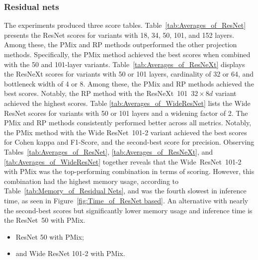 




\FloatBarrier

\subsubsection{Residual nets}

The experiments produced three score tables.
Table~\ref{tab:Averages_of_ResNet} presents the ResNet scores for variants with 18, 34, 50, 101, and 152 layers. Among these, the \gls{PMix} and \gls{RP} methods outperformed the other projection methods. Specifically, the \gls{PMix} method achieved the best scores when combined with the 50 and 101-layer variants.
Table~\ref{tab:Averages_of_ResNeXt} displays the ResNeXt scores for variants with 50 or 101 layers, cardinality of 32 or 64, and bottleneck width of 4 or 8. Among these, the \gls{PMix} and \gls{RP} methods achieved the best scores. Notably, the \gls{RP} method with the \mbox{ResNeXt 101 $32\times 8d$} variant achieved the highest scores.
Table \ref{tab:Averages_of_WideResNet} lists the Wide ResNet scores for variants with 50 or 101 layers and a widening factor of 2. The \gls{PMix} and \gls{RP} methods consistently performed better across all metrics. Notably, the \gls{PMix} method with the Wide \mbox{ResNet 101-2} variant achieved the best scores for Cohen kappa and F1-Score, and the second-best score for precision.
Observing Tables~\ref{tab:Averages_of_ResNet}, \ref{tab:Averages_of_ResNeXt}, and \ref{tab:Averages_of_WideResNet} together reveals that the \mbox{Wide ResNet 101-2} with \gls{PMix} was the top-performing combination in terms of scoring. However, this combination had the highest memory usage, according to Table~\ref{tab:Memory_of_Residual Nets}, and was the fourth slowest in inference time, as seen in Figure~\ref{fig:Time_of_ResNet based}. An alternative with nearly the second-best scores but significantly lower memory usage and inference time is the \mbox{ResNet 50} with \gls{PMix}.  
\begin{itemize}
	\item ResNet 50 with \gls{PMix}; 
	\item and Wide ResNet 101-2 with \gls{PMix}. 
\end{itemize}


